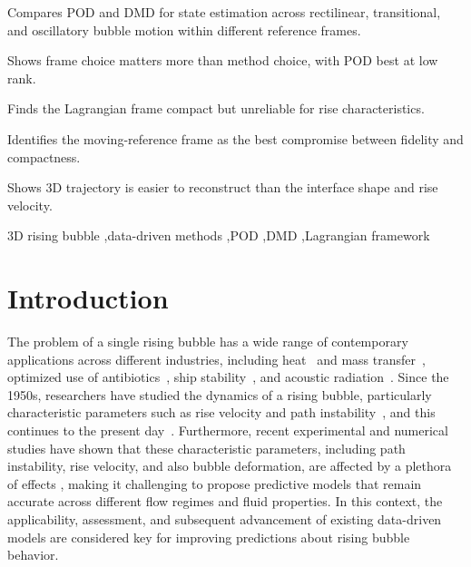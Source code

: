 \documentclass[a4paper,fleqn]{cas-sc}
\begin{document}
	\begin{highlights}
		\item Compares POD and DMD for state estimation across rectilinear, transitional, and oscillatory bubble motion within different reference frames.
		\item Shows frame choice matters more than method choice, with POD best at low rank.
		\item Finds the Lagrangian frame compact but unreliable for rise characteristics.
		\item Identifies the moving-reference frame as the best compromise between fidelity and compactness.
		\item Shows 3D trajectory is easier to reconstruct than the interface shape and rise velocity.
	\end{highlights}
	
	\begin{keywords}
		3D rising bubble \sep data-driven methods \sep POD \sep DMD \sep Lagrangian framework
	\end{keywords}

	\maketitle
	\linenumbers
	

	\section{Introduction}
	\label{Introduction}
	
	The problem of a single rising bubble has a wide range of contemporary applications across different industries, including heat~\cite{Larimi2018} and mass transfer~\cite{Kentheswaran2023}, optimized use of antibiotics~\cite{Hamdollahi2022}, ship stability~\cite{Fang2022}, and acoustic radiation~\cite{Ouyang2021}. Since the 1950s, researchers have studied the dynamics of a rising bubble, particularly characteristic parameters such as rise velocity and path instability~\cite{Saffman1956,TSUGE1977,Duineveld1995}, and this continues to the present day~\cite{Shi2024,Bonnefis2024,Hosen2024}. Furthermore, recent experimental and numerical studies have shown that these characteristic parameters, including path instability, rise velocity, and also bubble deformation, are affected by a plethora of effects \cite{Liu2006,Cano-Lozano2016,Kure2021}, making it challenging to propose predictive models that remain accurate across different flow regimes and fluid properties. In this context, the applicability, assessment, and subsequent advancement of existing data-driven models are considered key for improving predictions about rising bubble behavior.
	
\end{document}
